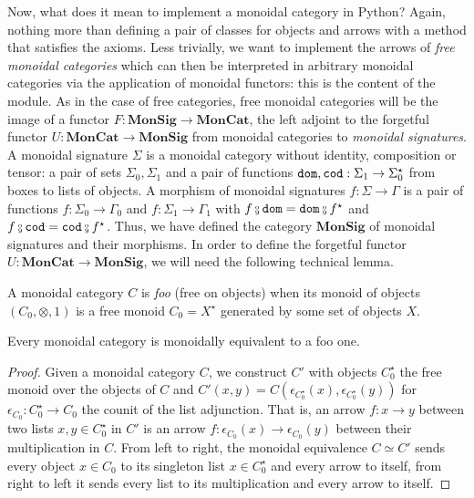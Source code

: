 Now, what does it mean to implement a monoidal category in Python?
Again, nothing more than defining a pair of classes for objects and arrows with a  method that satisfies the axioms.
Less trivially, we want to implement the arrows of \emph{free monoidal categories} which can then be interpreted in arbitrary monoidal categories via the application of monoidal functors: this is the content of the  module.
As in the case of free categories, free monoidal categories will be the image of a functor $F : \mathbf{MonSig} \to \mathbf{MonCat}$, the left adjoint to the forgetful functor $U : \mathbf{MonCat} \to \mathbf{MonSig}$ from monoidal categories to \emph{monoidal signatures}.
A monoidal signature $\Sigma$ is a monoidal category without identity, composition or tensor: a pair of sets $\Sigma_0, \Sigma_1$ and a pair of functions $\mathtt{dom}, \mathtt{cod} : \Sigma_1 \to \Sigma_0^\star$ from boxes to lists of objects.
A morphism of monoidal signatures $f : \Sigma \to \Gamma$ is a pair of functions $f : \Sigma_0 \to \Gamma_0$ and $f : \Sigma_1 \to \Gamma_1$ with $f \fcmp \dom = \dom \fcmp f^\star$ and $f \fcmp \cod = \cod \fcmp f^\star$.
Thus, we have defined the category $\mathbf{MonSig}$ of monoidal signatures and their morphisms.
In order to define the forgetful functor $U : \mathbf{MonCat} \to \mathbf{MonSig}$, we will need the following technical lemma.

\begin{definition}
A monoidal category $C$ is \emph{foo} (free on objects) when its monoid of objects $(C_0, \otimes, 1)$ is a free monoid $C_0 = X^\star$ generated by some set of objects $X$.
\end{definition}

\begin{lemma}\label{lemma:foo-monoidal}
Every monoidal category is monoidally equivalent to a foo one.
\end{lemma}

\begin{proof}
Given a monoidal category $C$, we construct $C'$ with objects $C_0^\star$ the free monoid over the objects of $C$ and $C'(x, y) = C(\epsilon_{C_0^\star}(x), \epsilon_{C_0^\star}(y))$ for $\epsilon_{C_0} : C_0^\star \to C_0$ the counit of the list adjunction.
That is, an arrow $f : x \to y$ between two lists $x, y \in C_0^\star$ in $C'$ is an arrow $f : \epsilon_{C_0}(x) \to \epsilon_{C_0}(y)$ between their multiplication in $C$.
From left to right, the monoidal equivalence $C \simeq C'$ sends every object $x \in C_0$ to its singleton list $x \in C_0^\star$ and every arrow to itself, from right to left it sends every list to its multiplication and every arrow to itself.
\end{proof}

